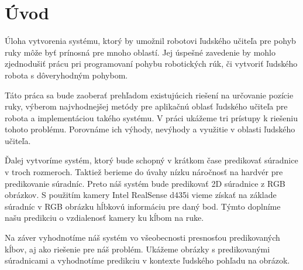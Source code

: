 \chapter*{Úvod}\label{chap:intro}
Úloha vytvorenia systému, ktorý by umožnil robotovi ľudského učiteľa pre pohyb ruky môže byť prínosná pre mnoho oblastí. Jej úspešné zavedenie by mohlo zjednodušiť prácu pri programovaní pohybu robotických rúk, či vytvoriť ľudského robota s dôveryhodným pohybom. 

Táto práca sa bude zaoberať prehľadom existujúcich riešení na určovanie pozície ruky, výberom najvhodnejšej metódy pre aplikačnú oblasť ľudského učiteľa pre robota a implementáciou takého systému. V práci ukážeme tri prístupy k riešeniu tohoto problému. Porovnáme ich výhody, nevýhody a využitie v oblasti ľudského učiteľa.

Ďalej vytvoríme systém, ktorý bude schopný v krátkom čase predikovať súradnice v troch rozmeroch. Taktiež berieme do úvahy nízku náročnosť na hardvér pre predikovanie súradníc. Preto náš systém bude predikovať 2D súradnice z RGB obrázkov. S použitím kamery Intel RealSense d435i vieme získať na základe súradníc v RGB obrázku hĺbkovú informáciu pre daný bod. Týmto doplníme našu predikciu o vzdialenosť kamery ku kĺbom na ruke.

Na záver vyhodnotíme náš systém vo všeobecnosti presnosťou predikovaných kĺbov, aj ako riešenie pre náš problém. Ukážeme obrázky s predikovanými súradnicami a vyhodnotíme predikciu v kontexte ľudského pohľadu na obrázok.